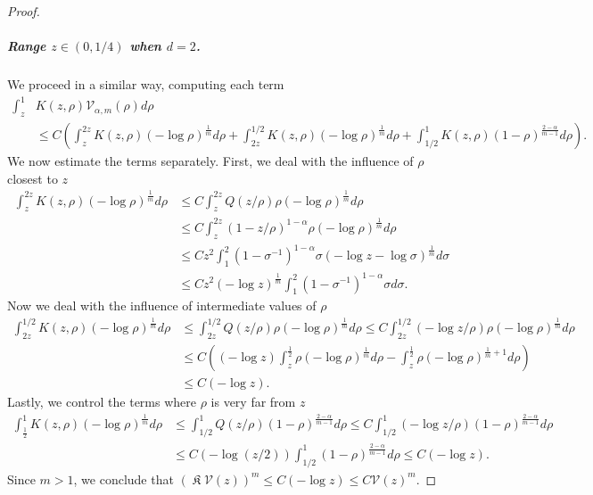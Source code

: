 \documentclass[10pt,a4paper]{amsart}
\DeclareMathOperator{\fixedpoint}{\mathfrak K}
\begin{document}
\begin{proof}
\subparagraph{Range $z \in (0,1/4)$ when $d = 2$.}
We proceed in a similar way, computing each term
\begin{align*}
  \int_z^1 & K(z,\rho) \mathcal V_{\alpha,m} (\rho) d \rho
  \\
  & \le C \left( \int_z^{2z}  K(z, \rho) (-\log \rho)^{\frac 1 m} d \rho + \int_{2z}^{1/2}   K(z, \rho) (-\log \rho) ^{\frac 1 m}d \rho + \int_{1/2}^{1}  K(z, \rho) (1-\rho)^{\frac{2-\alpha}{m-1}} d \rho \right).
\end{align*}
We now estimate the terms separately. First, we deal with the influence of $\rho$ closest to $z$
\begin{align*}
  \int_z^{2z}  K(z, \rho) (-\log \rho)^{\frac 1 m} d \rho
  & \le C \int_z^{2z}  Q(z/ \rho) \rho(-\log \rho)^{\frac 1 m} d \rho
  \\
  & \le C  \int_z^{2z}  (1 - z/\rho)^{1-\alpha}  \rho(-\log \rho)^{\frac 1 m} d \rho
  \\
  & \le C z^2 \int_1^{2}  (1 - \sigma^{-1})^{1-\alpha}  \sigma (-\log z - \log \sigma)^{\frac 1 m} d \sigma
  \\
  & \le  C z^2 (-\log z)^{\frac 1 m} \int_1^{2}  (1 - \sigma^{-1})^{1-\alpha}  \sigma  d \sigma.
\end{align*}
Now we deal with the influence of intermediate values of $\rho$
\begin{align*}
  \int_{2z}^{1/2}  K(z, \rho) (-\log \rho)^{\frac 1 m} d \rho
  & \le \int_{2z}^{1/2}   Q(z/\rho) \rho(-\log \rho)^{\frac 1 m} d \rho
  \le C \int_{2z}^{1/2}(-\log z/\rho)\rho(-\log \rho)^{\frac 1 m} d \rho
  \\
  & \le C\left( (-\log z) \int_{z}^{\frac 1 2} \rho (-\log \rho)^{\frac 1 m} d\rho -   \int_{z}^{\frac 1 2} \rho (-\log \rho)^{\frac 1 m + 1}d\rho \right)
  \\
  & \le C (-\log z).
\end{align*}
Lastly, we control the terms where $\rho$ is very far from $z$
\begin{align*}
  \int_{\frac 1 2}^{1}  K(z, \rho) (-\log \rho)^{\frac 1 m} d \rho
  & \le \int_{1/2}^{1}  Q(z/\rho) (1-\rho)^{\frac{2-\alpha}{m-1}} d \rho
  \le C \int_{1/2}^{1} (-\log z/\rho) (1-\rho)^{\frac{2-\alpha}{m-1}} d \rho
  \\
  & 
  \le  C (-\log (z/2)) \int_{1/2}^{1} (1-\rho)^{\frac{2-\alpha}{m-1}} d \rho
  \le C (-\log z).
\end{align*}
Since $m > 1$, we conclude that $(\fixedpoint\mathcal V (z))^{m} \le C (-\log z) \le C \mathcal V(z)^m$. 
\end{proof}
\end{document}
